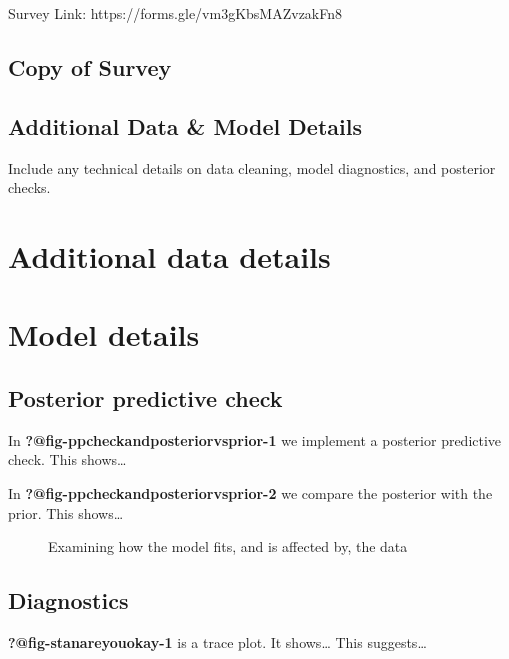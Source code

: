 \documentclass[
  letterpaper,
  DIV=11,
  numbers=noendperiod]{scrartcl}
\begin{document}
Survey Link: https://forms.gle/vm3gKbsMAZvzakFn8

\subsection{Copy of Survey}\label{copy-of-survey}

\subsection{Additional Data \& Model
Details}\label{additional-data-model-details}

Include any technical details on data cleaning, model diagnostics, and
posterior checks.

\section{Additional data details}\label{additional-data-details}

\section{Model details}\label{sec-model-details}

\subsection{Posterior predictive
check}\label{posterior-predictive-check}

In \textbf{?@fig-ppcheckandposteriorvsprior-1} we implement a posterior
predictive check. This shows\ldots{}

In \textbf{?@fig-ppcheckandposteriorvsprior-2} we compare the posterior
with the prior. This shows\ldots{}

\begin{figure}

\begin{minipage}{0.50\linewidth}
Examining how the model fits, and is affected by, the
data\end{minipage}%

\end{figure}%

\subsection{Diagnostics}\label{diagnostics}

\textbf{?@fig-stanareyouokay-1} is a trace plot. It shows\ldots{} This
suggests\ldots{}
\end{document}
